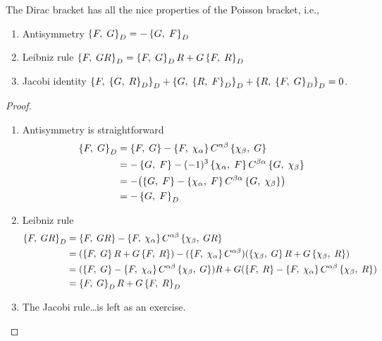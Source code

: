 \begin{theorem}
The Dirac bracket has all the nice properties of the Poisson bracket,
i.e.,
\begin{enumerate}
\item Antisymmetry $\left\{F,\;G\right\}_{D}=-\left\{G,\;F\right\}_{D}$
\item Leibniz rule $\left\{F,\;GR\right\}_{D}=\left\{F,\;G\right\}_{D}R+G\left\{F,\;R\right\}_{D}$
\item Jacobi identity $\left\{F,\;\left\{G,\;R\right\}_{D}\right\}_{D}+\left\{G,\;\left\{R,\;F\right\}_{D}\right\}_{D}+\left\{R,\;\left\{F,\;G\right\}_{D}\right\}_{D}=0$.
\end{enumerate}
\end{theorem}
\begin{proof}
\begin{enumerate}
\item Antisymmetry is straightforward
\begin{subequations}
\begin{align}
\left\{F,\;G\right\}_{D}
&=\left\{F,\;G\right\} - \left\{F,\;\chi_{\alpha}\right\}C^{\alpha\beta}\left\{\chi_{\beta},\;G\right\}\\
&=-\left\{G,\;F\right\} - (-1)^{3}\left\{\chi_{\alpha},\;F\right\}C^{\beta\alpha}\left\{G,\;\chi_{\beta}\right\}\\
&=-\bigl(\left\{G,\;F\right\} - \left\{\chi_{\alpha},\;F\right\}C^{\beta\alpha}\left\{G,\;\chi_{\beta}\right\}\bigr)\\
&=-\left\{G,\;F\right\}_{D}
\end{align}
\end{subequations}
\item Leibniz rule
\begin{subequations}
\begin{align}
\left\{F,\;GR\right\}_{D}
&=\left\{F,\;GR\right\}-\left\{F,\;\chi_{\alpha}\right\}C^{\alpha\beta}\left\{\chi_{\beta},\;GR\right\}\\
&=(\left\{F,\;G\right\}R + G\left\{F,\;R\right\})-(\left\{F,\;\chi_{\alpha}\right\}C^{\alpha\beta})(\left\{\chi_{\beta},\;G\right\}R+G\left\{\chi_{\beta},\;R\right\})\\
&=(\left\{F,\;G\right\} - \left\{F,\;\chi_{\alpha}\right\}C^{\alpha\beta}\left\{\chi_{\beta},\;G\right\})R
+G(\left\{F,\;R\right\}-\left\{F,\;\chi_{\alpha}\right\}C^{\alpha\beta}\left\{\chi_{\beta},\;R\right\})\\
&=\left\{F,\;G\right\}_{D}R+G\left\{F,\;R\right\}_{D}
\end{align}
\end{subequations}
\item The Jacobi rule\dots is left as an exercise.
\end{enumerate}
\end{proof}

